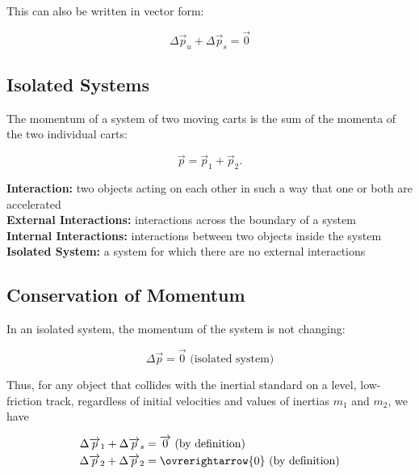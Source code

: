             This can also be written in vector form:

            \[
                \Delta \overrightarrow{p}_u + \Delta \overrightarrow{p}_s = \overrightarrow{0}
            \]



        \subsection{Isolated Systems}

            The momentum of a system of two moving carts is the sum of the momenta of the two individual carts:

            \[
                \overrightarrow{p} = \overrightarrow{p}_1 + \overrightarrow{p}_2.
            \]

            \textbf{Interaction:} two objects acting on each other in such a way that one or both are accelerated \\
            \textbf{External Interactions:} interactions across the boundary of a system \\
            \textbf{Internal Interactions:} interactions between two objects inside the system \\
            \textbf{Isolated System:} a system for which there are no external interactions

        \subsection{Conservation of Momentum}

            In an isolated system, the momentum of the system is not changing:

            \[
                \Delta \overrightarrow{p} = \overrightarrow{0} \text{ (isolated system)}
            \]

            Thus, for any object that collides with the inertial standard on a level, low-friction track, regardless of initial velocities and values of inertias $m_1$ and $m_2$, we have

            \begin{align*}
                \Delta \overrightarrow{p}_1 + \Delta \overrightarrow{p}_s &= \overrightarrow{0} \text{ (by definition)} \\
                \Delta \overrightarrow{p}_2 + \Delta \overrightarrow{p}_2 &= \ovrerightarrow{0} \text{ (by definition)}
            \end{align*}


